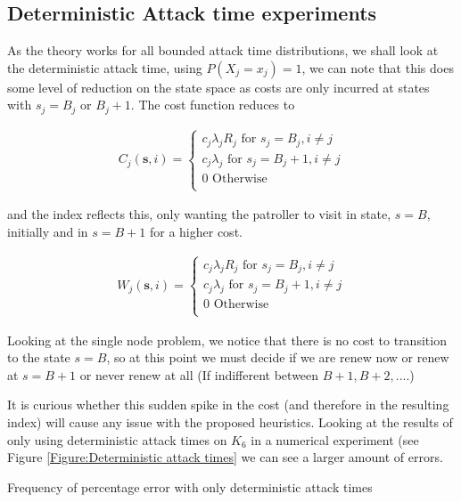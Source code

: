 \documentclass[a4paper,10pt]{article}
\theoremstyle{definition}
\theoremstyle{definition}
\theoremstyle{remark}
\theoremstyle{definition}
\begin{document}
\subsection{Deterministic Attack time experiments}
As the theory  works for all bounded attack time distributions, we shall look at the deterministic attack time, using $P(X_{j}=x_{j})=1$, we can note that this does some level of reduction on the state space as costs are only incurred at states with $s_{j}=B_{j}$ or $B_{j}+1$. The cost function reduces to

\begin{align*}
C_{j}(\bm{s},i)=\begin{cases}
c_{j} \lambda_{j} R_{j}  \text{ for } s_{j}=B_{j},i \neq j \\ 
c_{j} \lambda_{j} \text{ for } s_{j}=B_{j}+1,i \neq j  \\
0 \text{ Otherwise} \\
\end{cases}
\end{align*}

and the index reflects this, only wanting the patroller to visit in state, $s=B$, initially and in $s=B+1$ for a higher cost.

\begin{align*}
W_{j}(\bm{s},i)=\begin{cases}
c_{j} \lambda_{j} R_{j}  \text{ for } s_{j}=B_{j},i \neq j \\ 
c_{j} \lambda_{j} \text{ for } s_{j}=B_{j}+1,i \neq j  \\
0 \text{ Otherwise} \\
\end{cases}
\end{align*}

Looking at the single node problem, we notice that there is no cost to transition to the state $s=B$, so at this point we must decide if we are renew now or renew at $s=B+1$ or never renew at all (If indifferent between $B+1,B+2,....$)

It is curious whether this sudden spike in the cost (and therefore in the resulting index) will cause any issue with the proposed heuristics. Looking at the results of only using deterministic attack times on $K_{6}$ in a numerical experiment (see Figure \ref{Figure:Deterministic attack times} we can see a larger amount of errors.

\begin{myfigure}
\label{Figure:Deterministic attack times}
\begin{center}

\end{center}
\caption{Frequency of percentage error with only deterministic attack times}
\end{myfigure}
\end{document}
